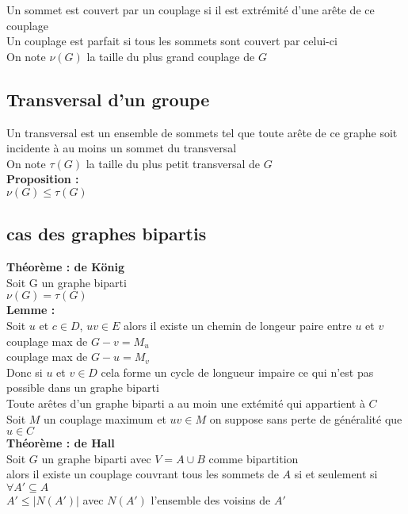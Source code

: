 \documentclass{report}
\newcommand{\propo}{\textcolor[rgb]{0,0,0.75}{Proposition : }}
\newcommand{\Propo}{\textbf{\propo}}
\newcommand{\thm}{\textcolor[rgb]{0,0.4,1}{Théorème : }}
\newcommand{\THM}{\textbf{\thm}}
\newcommand{\lemme}{\textcolor[rgb]{0,0.2,0.80}{Lemme : }}
\newcommand{\Lemme}{\textbf{\lemme}}
\begin{document}
Un sommet est couvert par un couplage si il est extrémité d'une arête de ce couplage\\
Un couplage est parfait si tous les sommets sont couvert par celui-ci\\
On note $\nu(G)$ la taille du plus grand couplage de $G$\\
\subsection{Transversal d'un groupe}
Un transversal est un ensemble de sommets tel que toute arête de ce graphe soit incidente à au moins un sommet du transversal\\
On note $\tau(G)$ la taille du plus petit transversal de $G$\\

\Propo\\
$\nu(G) \leq \tau(G)$\\

\subsection{cas des graphes bipartis}
\textbf{\THM de König}\\
Soit G un graphe biparti\\
$\nu(G) = \tau(G)$\\

\Lemme\\
Soit $u$ et $c \in D$, $uv \in E$ alors il existe un chemin de longeur paire entre $u$ et $v$\\
couplage max de $G-v=M_u$\\
couplage max de $G-u=M_v$\\
Donc si $u$ et $v \in D$ cela forme un cycle de longueur impaire ce qui n'est pas possible dans un graphe biparti\\
Toute arêtes d'un graphe biparti a au moin une extémité qui appartient à $C$\\
Soit $M$ un couplage maximum et $uv \in M$ on suppose sans perte de généralité que  $u \in C$\\

\textbf{\THM de Hall}\\
Soit $G$ un graphe biparti avec $V=A \cup B $ comme bipartition\\
alors il existe un couplage couvrant tous les sommets de $A$ si et seulement si $\forall A' \subseteq A$\\
$A' \leq |N(A')|$ avec $N(A')$ l'ensemble des voisins de $A'$ \\
\end{document}
